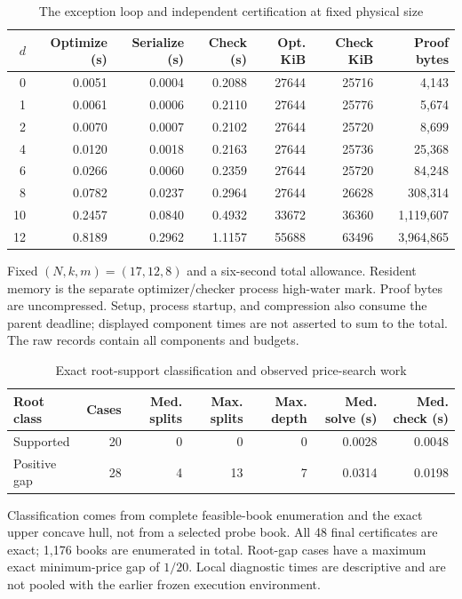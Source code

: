 \documentclass[11pt,letterpaper]{article}
\theoremstyle{definition}\newtheorem{remark}[theorem]{Remark}
\begin{document}
\begin{table}[p]\centering\caption{The exception loop and independent certification at fixed physical size}\label{tab:d63}
\begin{singlespace}\small\begin{tabular}{rrrrrrr}\toprule
$d$ & Optimize (s) & Serialize (s) & Check (s) & Opt. KiB & Check KiB & Proof bytes\\\midrule
0 & 0.0051 & 0.0004 & 0.2088 & 27644 & 25716 & 4,143 \\
1 & 0.0061 & 0.0006 & 0.2110 & 27644 & 25776 & 5,674 \\
2 & 0.0070 & 0.0007 & 0.2102 & 27644 & 25720 & 8,699 \\
4 & 0.0120 & 0.0018 & 0.2163 & 27644 & 25736 & 25,368 \\
6 & 0.0266 & 0.0060 & 0.2359 & 27644 & 25720 & 84,248 \\
8 & 0.0782 & 0.0237 & 0.2964 & 27644 & 26628 & 308,314 \\
10 & 0.2457 & 0.0840 & 0.4932 & 33672 & 36360 & 1,119,607 \\
12 & 0.8189 & 0.2962 & 1.1157 & 55688 & 63496 & 3,964,865 \\
\bottomrule\end{tabular}\par\smallskip\begin{minipage}{\textwidth}\footnotesize Fixed $(N,k,m)=(17,12,8)$ and a six-second total allowance. Resident memory is the separate optimizer/checker process high-water mark. Proof bytes are uncompressed. Setup, process startup, and compression also consume the parent deadline; displayed component times are not asserted to sum to the total. The raw records contain all components and budgets.\end{minipage}\end{singlespace}\end{table}
\begin{table}[p]\centering\caption{Exact root-support classification and observed price-search work}\label{tab:root63}
\begin{singlespace}\small\begin{tabular}{lrrrrrr}\toprule
Root class & Cases & Med. splits & Max. splits & Max. depth & Med. solve (s) & Med. check (s)\\\midrule
Supported & 20 & 0 & 0 & 0 & 0.0028 & 0.0048 \\
Positive gap & 28 & 4 & 13 & 7 & 0.0314 & 0.0198 \\
\bottomrule\end{tabular}\par\smallskip\begin{minipage}{\textwidth}\footnotesize Classification comes from complete feasible-book enumeration and the exact upper concave hull, not from a selected probe book. All 48 final certificates are exact; 1,176 books are enumerated in total. Root-gap cases have a maximum exact minimum-price gap of $1/20$. Local diagnostic times are descriptive and are not pooled with the earlier frozen execution environment.\end{minipage}\end{singlespace}\end{table}
\end{document}
